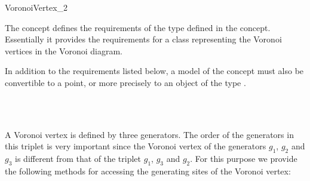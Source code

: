 


\begin{ccRefConcept}{VoronoiVertex_2}

\ccDefinition

The concept  defines the requirements of the
 type defined in the 
concept. Essentially it provides the requirements for a class
representing the Voronoi vertices in the Voronoi diagram.

In addition to the requirements listed below, a model of the
 concept must also be convertible to a
point, or more precisely to an object of the type
.


\ccRefines
{}\\
\\

\ccTypes
{}
%
\ccGlue
{}
\ccGlue
{}




A Voronoi vertex is defined by three generators. The order of the
generators in this triplet is very important since the Voronoi vertex
of the generators $g_1$, $g_2$ and $g_3$ is different from that of the
triplet $g_1$, $g_3$ and $g_2$. For this purpose we provide the
following methods for accessing the generating sites of the Voronoi
vertex:


\end{ccRefConcept}
